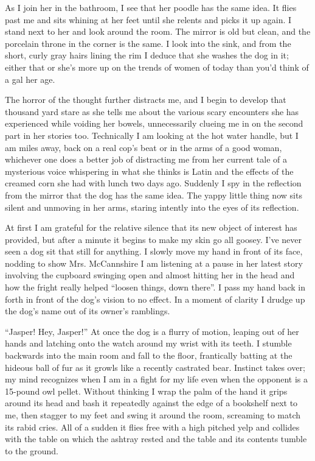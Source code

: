 As I join her in the bathroom, I see that her poodle has the same
idea. It flies past me and sits whining at her feet until she
relents and picks it up again. I stand next to her and look around
the room. The mirror is old but clean, and the porcelain throne in
the corner is the same. I look into the sink, and from the short,
curly gray hairs lining the rim I deduce that she washes the dog in
it; either that or she's more up on the trends of women of today
than you'd think of a gal her age.



The horror of the thought further distracts me, and I begin to
develop that thousand yard stare as she tells me about the various
scary encounters she has experienced while voiding her bowels,
unnecessarily clueing me in on the second part in her stories too.
Technically I am looking at the hot water handle, but I am miles
away, back on a real cop's beat or in the arms of a good woman,
whichever one does a better job of distracting me from her current
tale of a mysterious voice whispering in what she thinks is Latin
and the effects of the creamed corn she had with lunch two days
ago. Suddenly I spy in the reflection from the mirror that the dog
has the same idea. The yappy little thing now sits silent and
unmoving in her arms, staring intently into the eyes of its
reflection.



At first I am grateful for the relative silence that its new object
of interest has provided, but after a minute it begins to make my
skin go all goosey. I've never seen a dog sit that still for
anything. I slowly move my hand in front of its face, nodding to
show Mrs. McCannshire I am listening at a pause in her latest story
involving the cupboard swinging open and almost hitting her in the
head and how the fright really helped ``loosen things, down there''.
I pass my hand back in forth in front of the dog's vision to no
effect. In a moment of clarity I drudge up the dog's name out of
its owner's ramblings.



``Jasper! Hey, Jasper!'' At once the dog is a flurry of motion,
leaping out of her hands and latching onto the watch around my
wrist with its teeth. I stumble backwards into the main room and
fall to the floor, frantically batting at the hideous ball of fur
as it growls like a recently castrated bear. Instinct takes over;
my mind recognizes when I am in a fight for my life even when the
opponent is a 15-pound owl pellet. Without thinking I wrap the palm
of the hand it grips around its head and bash it repeatedly against
the edge of a bookshelf next to me, then stagger to my feet and
swing it around the room, screaming to match its rabid cries. All
of a sudden it flies free with a high pitched yelp and collides
with the table on which the ashtray rested and the table and its
contents tumble to the ground.



